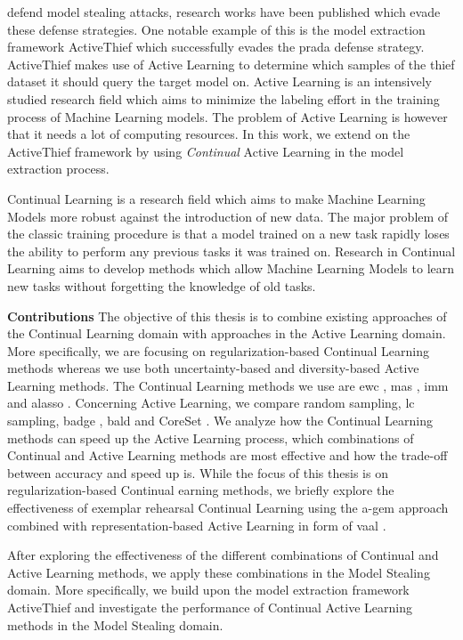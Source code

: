 defend model stealing attacks, research works have been published which evade these defense strategies. One notable example of this is the model
extraction framework ActiveThief \cite{pal2020activethief} which successfully evades the \gls{prada} defense strategy. ActiveThief makes use of Active
Learning to determine which samples of the thief dataset it should query the target model on. Active Learning is an intensively studied research
field which aims to minimize the labeling effort in the training process of Machine Learning models. The problem of Active Learning is however that it
needs a lot of computing resources. In this work, we extend on the ActiveThief framework by using \textit{Continual} Active Learning in the model
extraction process.\par
Continual Learning is a research field which aims to make Machine Learning Models more robust against the introduction of new data. The major problem
of the classic training procedure is that a model trained on a new task rapidly loses the ability to perform any previous tasks it was trained on.
Research in Continual Learning aims to develop methods which allow Machine Learning Models to learn new tasks without forgetting the knowledge of old 
tasks. \par
\textbf{Contributions} \hspace{0.2cm} The objective of this thesis is to combine existing approaches of the Continual Learning domain
 with approaches in the Active Learning domain. More specifically, we are focusing on regularization-based Continual Learning methods
whereas we use both uncertainty-based and diversity-based Active Learning methods. The Continual Learning methods we use are \gls{ewc} \cite{kirkpatrick2017overcoming},
\gls{mas} \cite{aljundi2018memory}, \gls{imm} \cite{lee2017overcoming} and \gls{alasso} \cite{park2019continual}.
Concerning Active Learning, we compare random sampling, \gls{lc} \cite{lewis1995sequential} sampling, \gls{badge} \cite{ash2019deep}, \gls{bald} \cite{houlsby2011bayesian} and
CoreSet \cite{sener2017active}.
We analyze how the Continual Learning methods can speed up the Active Learning process, which combinations of Continual and Active Learning methods
are most effective and how the trade-off between accuracy and speed up is. While the focus of this thesis is on regularization-based Continual
earning methods, we briefly explore the effectiveness of exemplar rehearsal Continual Learning using the \gls{a-gem} approach \cite{chaudhry2018efficient}
combined with representation-based Active Learning in form of \gls{vaal} \cite{sinha2019variational}. \par
After exploring the effectiveness of the different combinations of Continual and Active Learning methods, we apply these combinations in the Model Stealing
domain. More specifically, we build upon the model extraction framework ActiveThief \cite{pal2020activethief} and investigate the performance of Continual
Active Learning methods in the Model Stealing domain.
